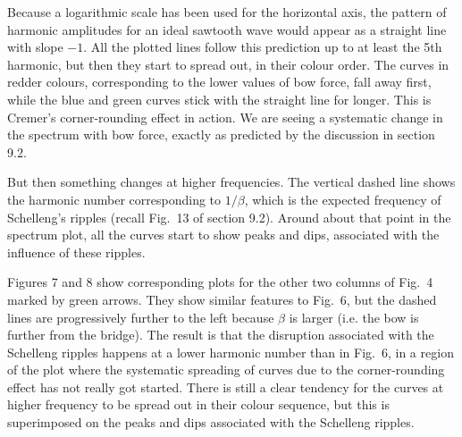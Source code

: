 
  Because a logarithmic scale has been used for the horizontal axis, the 
  pattern of harmonic amplitudes for an ideal sawtooth wave would appear as a 
  straight line with slope $-1$. All the plotted lines follow this prediction 
  up to at least the 5th harmonic, but then they start to spread out, in their 
  colour order. The curves in redder colours, corresponding to the lower values 
  of bow force, fall away first, while the blue and green curves stick with the 
  straight line for longer. This is Cremer’s corner-rounding effect in action. 
  We are seeing a systematic change in the spectrum with bow force, exactly as 
  predicted by the discussion in section 9.2. 

  But then something changes at higher frequencies. The vertical dashed line 
  shows the harmonic number corresponding to $1/\beta$, which is the expected 
  frequency of Schelleng’s ripples (recall Fig.\ 13 of section 9.2). Around 
  about that point in the spectrum plot, all the curves start to show peaks and 
  dips, associated with the influence of these ripples. 

  Figures 7 and 8 show corresponding plots for the other two columns of Fig.\ 4 
  marked by green arrows. They show similar features to Fig.\ 6, but the dashed 
  lines are progressively further to the left because $\beta$ is larger (i.e. 
  the bow is further from the bridge). The result is that the disruption 
  associated with the Schelleng ripples happens at a lower harmonic number than 
  in Fig.\ 6, in a region of the plot where the systematic spreading of curves 
  due to the corner-rounding effect has not really got started. There is still 
  a clear tendency for the curves at higher frequency to be spread out in their 
  colour sequence, but this is superimposed on the peaks and dips associated 
  with the Schelleng ripples. 



